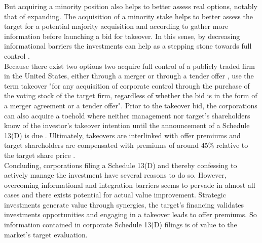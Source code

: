 \documentclass[12pt]{article}
\begin{document}
But acquiring a minority position also helps to better assess real options, notably that of expanding. The acquisition of a minority stake helps to better assess the target for a potential majority acquisition \citep{Ouimet2013} and according to \citet[p.30]{Huang2017} gather more information before launching a bid for takeover. In this sense, by decreasing informational barriers the investments can help as a stepping stone towards full control \citep[p.3]{Huang2017}.\\
Because there exist two options two acquire full control of a publicly traded firm in the United States, either through a merger or through a tender offer \citep[p.2]{Offenberg2015}, \citet[p.1]{Betton2008} use the term takeover "for any acquisition of corporate control through the purchase of the voting stock of the target firm, regardless of whether the bid is in the form of a merger agreement or a tender offer".
Prior to the takeover bid, the corporations can also acquire a toehold where neither management nor target's shareholders know of the investor's takeover intention until the announcement of a Schedule 13(D) is due \citet[p.158]{Eckbo2009}. Ultimately, takeovers are interlinked with offer premiums and target shareholders are compensated with premiums of around 45\% relative to the target share price \citep[p.154]{Eckbo2009}.\\
Concluding, corporations filing a Schedule 13(D) and thereby confessing to actively manage the investment have several reasons to do so. However, overcoming informational and integration barriers seems to pervade in almost all cases and there exists potential for actual value improvement. Strategic investments generate value through synergies, the target's financing validates investments opportunities and engaging in a takeover leads to offer premiums. So information contained in corporate Schedule 13(D) filings is of value to the market's target evaluation. 
\end{document}
